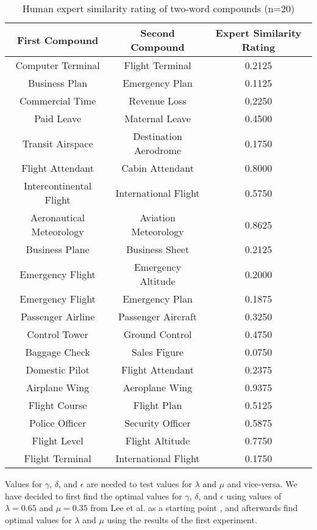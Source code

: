 \documentclass{article}
\begin{document}
\begin{table}[h!]
\caption{Human expert similarity rating of two-word compounds (n=20)}
\centering
\begin{tabular}{|c|c||c|}
	\hline
	First Compound & Second Compound & Expert Similarity Rating \\
	\hline
	Computer Terminal & Flight Terminal & 0.2125 \\
	Business Plan & Emergency Plan & 0.1125 \\
	Commercial Time & Revenue Loss & 0.2250 \\
	Paid Leave & Maternal Leave & 0.4500 \\
	Transit Airspace & Destination Aerodrome & 0.1750 \\
	Flight Attendant & Cabin Attendant & 0.8000 \\
	Intercontinental Flight & International Flight & 0.5750 \\
	Aeronautical Meteorology & Aviation Meteorology & 0.8625 \\
	Business Plane & Business Sheet & 0.2125 \\
	Emergency Flight & Emergency Altitude & 0.2000 \\
	Emergency Flight & Emergency Plan & 0.1875 \\
	Passenger Airline & Passenger Aircraft & 0.3250 \\
	Control Tower & Ground Control & 0.4750 \\
	Baggage Check & Sales Figure & 0.0750 \\
	Domestic Pilot & Flight Attendant & 0.2375 \\
	Airplane Wing & Aeroplane Wing & 0.9375 \\
	Flight Course & Flight Plan & 0.5125 \\
	Police Officer & Security Officer & 0.5875 \\
	Flight Level & Flight Altitude & 0.7750 \\
	Flight Terminal & International Flight & 0.1750 \\
	\hline
\end{tabular}
\label{table:humancompoundsimilarity}
\end{table}

Values for $\gamma$, $\delta$, and $\epsilon$ are needed to test values for $\lambda$ and $\mu$ and vice-versa. We have decided to first find the optimal values for $\gamma$, $\delta$, and $\epsilon$ using values of $\lambda = 0.65$ and $\mu = 0.35$ from Lee et al. as a starting point \cite{lee2016combining}, and afterwards find optimal values for $\lambda$ and $\mu$ using the results of the first experiment.
\end{document}

